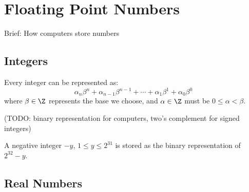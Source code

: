 \chapter{Floating Point Numbers}
Brief: How computers store numbers

\section{Integers}
Every integer can be represented as:
\[ \alpha_n \beta^n + \alpha_{n-1} \beta^{n-1} + \cdots + \alpha_{1} \beta^1 + \alpha_0 \beta^0 \]
where $\beta \in \Z$ represents the base we choose, and $\alpha \in \Z$ must be $0 \leq \alpha < \beta$.

(TODO: binary representation for computers, two's complement for signed integers)

A negative integer $-y$, $1 \leq y \leq 2^{31}$ is stored as the binary representation of $2^{32} - y$.

\section{Real Numbers}
